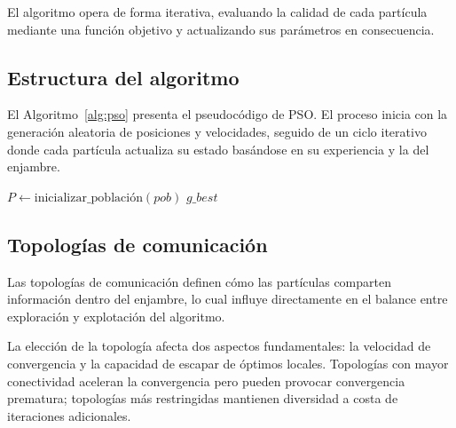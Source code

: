 El algoritmo opera de forma iterativa, evaluando la calidad de cada
partícula mediante una función objetivo y actualizando sus parámetros
en consecuencia.

\subsection{Estructura del algoritmo}

El Algoritmo~\ref{alg:pso} presenta el pseudocódigo de PSO. El
proceso inicia con la generación aleatoria de posiciones y
velocidades, seguido de un ciclo iterativo donde cada partícula
actualiza su estado basándose en su experiencia y la del enjambre.

\begin{algorithm}[H]
  \caption{PSO$(pob, c_1, c_2)$}
  \label{alg:pso}
  $P \gets \text{inicializar\_población}(pob)$\;
  \Regresar $g\_best$\;
\end{algorithm}

\subsection{Topologías de comunicación}

Las topologías de comunicación definen cómo las partículas comparten
información dentro del enjambre, lo cual influye directamente en el
balance entre exploración y explotación del algoritmo.

La elección de la topología afecta dos aspectos fundamentales: la
velocidad de convergencia y la capacidad de escapar de óptimos
locales. Topologías con mayor conectividad aceleran la convergencia
pero pueden provocar convergencia prematura; topologías más
restringidas mantienen diversidad a costa de iteraciones adicionales.

